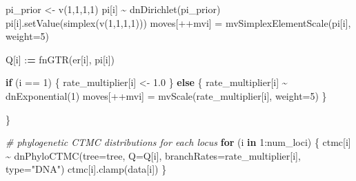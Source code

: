 \documentclass[
]{book}
\newenvironment{Shaded}{\begin{snugshade}}{\end{snugshade}}
\newcommand{\AttributeTok}[1]{\textcolor[rgb]{0.77,0.63,0.00}{#1}}
\newcommand{\CommentTok}[1]{\textcolor[rgb]{0.56,0.35,0.01}{\textit{#1}}}
\newcommand{\ControlFlowTok}[1]{\textcolor[rgb]{0.13,0.29,0.53}{\textbf{#1}}}
\newcommand{\DecValTok}[1]{\textcolor[rgb]{0.00,0.00,0.81}{#1}}
\newcommand{\ErrorTok}[1]{\textcolor[rgb]{0.64,0.00,0.00}{\textbf{#1}}}
\newcommand{\FloatTok}[1]{\textcolor[rgb]{0.00,0.00,0.81}{#1}}
\newcommand{\FunctionTok}[1]{\textcolor[rgb]{0.00,0.00,0.00}{#1}}
\newcommand{\NormalTok}[1]{#1}
\newcommand{\OtherTok}[1]{\textcolor[rgb]{0.56,0.35,0.01}{#1}}
\newcommand{\SpecialCharTok}[1]{\textcolor[rgb]{0.00,0.00,0.00}{#1}}
\newcommand{\StringTok}[1]{\textcolor[rgb]{0.31,0.60,0.02}{#1}}
\begin{document}
\begin{Shaded}
\begin{Highlighting}[]
\NormalTok{    pi\_prior }\OtherTok{\textless{}{-}} \FunctionTok{v}\NormalTok{(}\DecValTok{1}\NormalTok{,}\DecValTok{1}\NormalTok{,}\DecValTok{1}\NormalTok{,}\DecValTok{1}\NormalTok{)}
\NormalTok{    pi[i] }\SpecialCharTok{\textasciitilde{}} \FunctionTok{dnDirichlet}\NormalTok{(pi\_prior)}
\NormalTok{    pi[i]}\FunctionTok{.setValue}\NormalTok{(}\FunctionTok{simplex}\NormalTok{(}\FunctionTok{v}\NormalTok{(}\DecValTok{1}\NormalTok{,}\DecValTok{1}\NormalTok{,}\DecValTok{1}\NormalTok{,}\DecValTok{1}\NormalTok{)))}
\NormalTok{    moves[}\SpecialCharTok{++}\NormalTok{mvi] }\OtherTok{=} \FunctionTok{mvSimplexElementScale}\NormalTok{(pi[i], }\AttributeTok{weight=}\DecValTok{5}\NormalTok{)}

\NormalTok{    Q[i] }\SpecialCharTok{:}\ErrorTok{=} \FunctionTok{fnGTR}\NormalTok{(er[i], pi[i])}

    \ControlFlowTok{if}\NormalTok{ (i }\SpecialCharTok{==} \DecValTok{1}\NormalTok{) \{}
\NormalTok{        rate\_multiplier[i] }\OtherTok{\textless{}{-}} \FloatTok{1.0}
\NormalTok{    \} }\ControlFlowTok{else}\NormalTok{ \{}
\NormalTok{        rate\_multiplier[i] }\SpecialCharTok{\textasciitilde{}} \FunctionTok{dnExponential}\NormalTok{(}\DecValTok{1}\NormalTok{)}
\NormalTok{        moves[}\SpecialCharTok{++}\NormalTok{mvi] }\OtherTok{=} \FunctionTok{mvScale}\NormalTok{(rate\_multiplier[i], }\AttributeTok{weight=}\DecValTok{5}\NormalTok{)}
\NormalTok{    \}}

\NormalTok{\}}

\CommentTok{\# phylogenetic CTMC distributions for each locus}
\ControlFlowTok{for}\NormalTok{ (i }\ControlFlowTok{in} \DecValTok{1}\SpecialCharTok{:}\NormalTok{num\_loci) \{}
\NormalTok{    ctmc[i] }\SpecialCharTok{\textasciitilde{}} \FunctionTok{dnPhyloCTMC}\NormalTok{(}\AttributeTok{tree=}\NormalTok{tree, }\AttributeTok{Q=}\NormalTok{Q[i], }\AttributeTok{branchRates=}\NormalTok{rate\_multiplier[i], }\AttributeTok{type=}\StringTok{"DNA"}\NormalTok{)}
\NormalTok{    ctmc[i]}\FunctionTok{.clamp}\NormalTok{(data[i])  }
\NormalTok{\}}



\end{Highlighting}
\end{Shaded}
\end{document}

